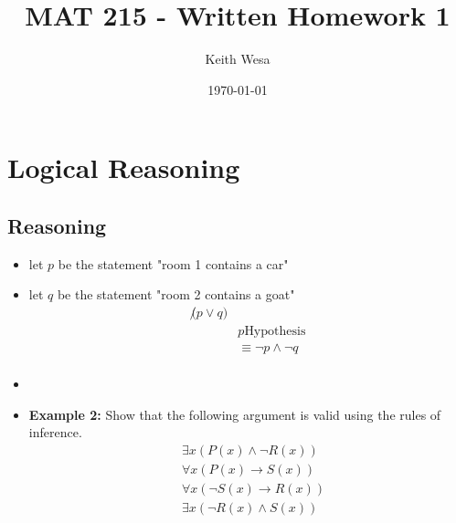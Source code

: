 \documentclass{article}
\author{Keith Wesa}
\title{MAT 215 - Written Homework 1}
\date{\today}
\begin{document}
\section*{Logical Reasoning}
\subsection*{Reasoning}
\begin{itemize}
    \item[] let $p$ be the statement "room 1 contains a car"
    \item[] let $q$ be the statement "room 2 contains a goat"
    \begin{align*}
        \not(p \lor q) \\
        & p \text{Hypothesis} \\
        &\equiv \neg p \land \neg q \\
    \end{align*}
    \item[]
    \item[] \textbf{Example 2:} Show that the following argument is valid using the rules of inference.
    \begin{align*}
        &\exists x(P(x) \land \lnot R(x)) \\
        & \forall x(P(x) \to S(x)) \\
        & \forall x(\lnot S(x) \to R(x)) \\
        & \exists x(\lnot R(x) \land S(x)) \\
    \end{align*}

\end{itemize}
\end{document}
